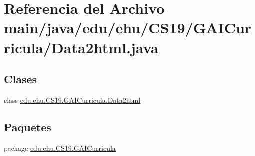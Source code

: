 \hypertarget{a00002}{}\section{Referencia del Archivo main/java/edu/ehu/\+C\+S19/\+G\+A\+I\+Curricula/\+Data2html.java}
\label{a00002}
\subsection*{Clases}
\begin{DoxyCompactItemize}
\item 
class \mbox{\hyperlink{a00025}{edu.\+ehu.\+C\+S19.\+G\+A\+I\+Curricula.\+Data2html}}
\end{DoxyCompactItemize}
\subsection*{Paquetes}
\begin{DoxyCompactItemize}
\item 
package \mbox{\hyperlink{a00017}{edu.\+ehu.\+C\+S19.\+G\+A\+I\+Curricula}}
\end{DoxyCompactItemize}
